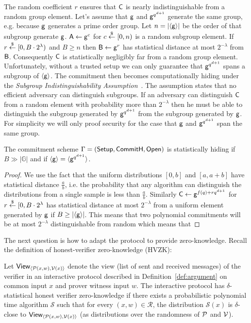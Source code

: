 The random coefficient $r$ ensures that $\mathsf{C}$ is nearly indistinguishable from a random group element. Let's assume that $\mathsf{g}$ and $\mathsf{g}^{q^{d+1}}$ generate the same group, e.g. because $\mathsf{g}$ generates a prime order group. Let $n=|\langle \mathsf{g}\rangle|$ be the order of that subgroup generate $\mathsf{g}$. $\mathsf{A}\gets\mathsf{g}^c$ for $c\overset{\$}{\gets} [0,n)$ is a random subgroup element. If $r \overset{\$}{\gets} [0,B\cdot 2^\lambda)$ and $B\geq n$ then $\mathsf{B}\gets \mathsf{g}^r$ has statistical distance at most $2^{-\lambda}$ from $\mathsf{B}$. Consequently $\mathsf{C}$ is statistically negligibly far from a random group element. 
 Unfortunately, without a trusted setup we can only guarantee that $\mathsf{g}^{q^{d+1}}$ spans a subgroup of $\langle \mathsf{g} \rangle$. The commitment then becomes computationally hiding under the \emph{Subgroup Indistinguishability Assumption}~\cite{C:BraGol10}. The assumption states that no efficient adversary can distinguish subgroups. If an adversary can distinguish $\mathsf{C}$ from a random element with probability more than $2^{-\lambda}$ then he must be able to distinguish the subgroup generated by $\mathsf{g}^{q^{d+1}}$ from the subgroup generated by $\mathsf{g}$. For simplicity we will only proof security for the case that $\mathsf{g}$ and $\mathsf{g}^{q^{d+1}}$ span the same group.
\begin{theorem}
The commitment scheme $\Gamma = (\textsf{{Setup}}, \textsf{{CommitH}}, \textsf{{Open}})$ is statistically hiding if $B \gg |\mathbb{G}|$ and if $\langle \mathsf{g} \rangle = \langle \mathsf{g}^{q^{d+1}} \rangle$.
\end{theorem}

\begin{proof}
We use the fact that the uniform distributions $[0,b]$ and $[a,a+b]$ have statistical distance $\frac{a}{b}$, i.e. the probability that any algorithm can distinguish the distributions from a single sample is less than $\frac{a}{b}$. Similarly $\mathsf{C}\gets\mathsf{g}^{f(q)+rq^{d+1}}$ for $r\overset{\$}{\gets}[0,B\cdot 2^{\lambda}$ has statistical distance at most $2^{-\lambda}$ from a uniform element generated by $\mathsf{g}$ if $B\geq |\langle \mathsf{g}\rangle|$. This means that two polynomial commitments will be at most $2^{-\lambda}$ distinguishable from random which means that 
\end{proof}



The next question is how to adapt the \eval protocol to provide zero-knowledge. Recall the definition of honest-verifier zero-knowledge (HVZK):

\begin{definition}
Let $\textsf{View}_{\langle \mathcal{P}(x, w), \mathcal{V}(x) \rangle}$ denote the view (list of sent and received messages) of the verifier in an interactive protocol described in Definition~\ref{def:argument} on common input $x$ and prover witness input $w$. The interactive protocol has $\delta$-statistical honest verifier zero-knowledge if there exists a probabilistic polynomial time algorithm $\mathcal{S}$ such that for every $(x, w) \in \mathcal{R}$, the distribution $\mathcal{S}(x)$ is $\delta$-close to $\textsf{View}_{\langle \mathcal{P}(x, w), \mathcal{V}(x) \rangle}$ (as distributions over the randomness of $\mathcal{P}$ and $\mathcal{V}$).
\end{definition}


